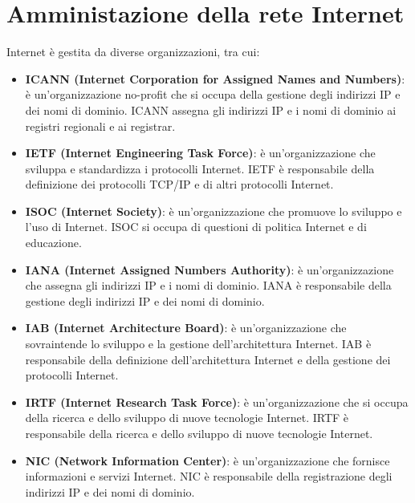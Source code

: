 \documentclass[12pt]{report}
\begin{document}
	\section{Amministazione della rete Internet}
	Internet è gestita da diverse organizzazioni, tra cui:
	\begin{itemize}
		\item \textbf{ICANN (Internet Corporation for Assigned Names and Numbers)}: è un'organizzazione no-profit che si occupa della gestione degli indirizzi IP e dei nomi di dominio. ICANN assegna gli indirizzi IP e i nomi di dominio ai registri regionali e ai registrar.
		\item \textbf{IETF (Internet Engineering Task Force)}: è un'organizzazione che sviluppa e standardizza i protocolli Internet. IETF è responsabile della definizione dei protocolli TCP/IP e di altri protocolli Internet.
		\item \textbf{ISOC (Internet Society)}: è un'organizzazione che promuove lo sviluppo e l'uso di Internet. ISOC si occupa di questioni di politica Internet e di educazione.
		\item \textbf{IANA (Internet Assigned Numbers Authority)}: è un'organizzazione che assegna gli indirizzi IP e i nomi di dominio. IANA è responsabile della gestione degli indirizzi IP e dei nomi di dominio.
		\item \textbf{IAB (Internet Architecture Board)}: è un'organizzazione che sovraintende lo sviluppo e la gestione dell'architettura Internet. IAB è responsabile della definizione dell'architettura Internet e della gestione dei protocolli Internet.
		\item \textbf{IRTF (Internet Research Task Force)}: è un'organizzazione che si occupa della ricerca e dello sviluppo di nuove tecnologie Internet. IRTF è responsabile della ricerca e dello sviluppo di nuove tecnologie Internet.
		\item \textbf{NIC (Network Information Center)}: è un'organizzazione che fornisce informazioni e servizi Internet. NIC è responsabile della registrazione degli indirizzi IP e dei nomi di dominio.
	\end{itemize}
\end{document}
